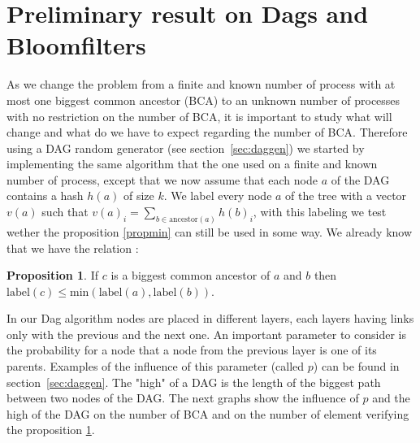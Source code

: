 \documentclass[a4paper,10pt]{report}
\theoremstyle{definition}
\newtheorem{proposition}{Proposition}
\theoremstyle{definition}
\begin{document}
\section{Preliminary result on Dags and Bloomfilters}
As we change the problem from a finite and known number of process with at most one biggest common ancestor (BCA) to an unknown number of processes with no restriction on the number of BCA, it is important to study what will change and what do we have to expect regarding the number of BCA. Therefore using a DAG random generator (see section~\ref{sec:daggen}) we started by implementing the same algorithm that the one used on a finite and known number of process, except that we now assume that each node $a$ of the DAG contains a hash $h(a)$ of size $k$. We label every node $a$ of the tree with a vector $v(a)$ such that $v(a)_i=\sum_{b\in \mathrm{ancestor}(a)} h(b)_i$, with this labeling we test wether the proposition \ref{propmin} can still be used in some way. We already know that we have the relation :
\begin{proposition}
 If $c$ is a biggest common ancestor of $a$ and $b$ then $\mathrm{label}(c) \leq \mathrm{min}(\mathrm{label}(a),\mathrm{label}(b))$. \label{propinf}
\end{proposition}
In our Dag algorithm nodes are placed in different layers, each layers having links only with the previous and the next one. An important parameter to consider is the probability for a node that a node from the previous layer is one of its parents. Examples of the influence of this parameter (called $p$) can be found in section~\ref{sec:daggen}. The "high" of a DAG is the length of the biggest path between two nodes of the DAG. The next graphs show the influence of $p$ and the high of the DAG on the number of BCA and on the number of element verifying the proposition \ref{propinf}.
\end{document}
